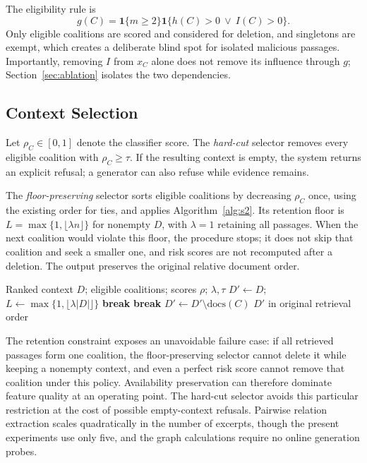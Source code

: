 \documentclass[sigconf]{aamas}
\begin{document}
The eligibility rule is
\begin{equation}
g(C)=\mathbf{1}\{m\geq2\}\mathbf{1}\{h(C)>0\ \lor\ I(C)>0\}.
\label{eq:gate}
\end{equation}
Only eligible coalitions are scored and considered for deletion, and singletons are exempt, which creates a deliberate blind spot for isolated malicious passages. Importantly, removing $I$ from $x_C$ alone does not remove its influence through $g$; Section~\ref{sec:ablation} isolates the two dependencies.

\subsection{Context Selection}
Let $\rho_C\in[0,1]$ denote the classifier score. The \emph{hard-cut} selector removes every eligible coalition with $\rho_C\geq\tau$. If the resulting context is empty, the system returns an explicit refusal; a generator can also refuse while evidence remains.

The \emph{floor-preserving} selector sorts eligible coalitions by decreasing $\rho_C$ once, using the existing order for ties, and applies Algorithm~\ref{alg:s2}. Its retention floor is $L=\max\{1,\lfloor\lambda n\rfloor\}$ for nonempty $D$, with $\lambda=1$ retaining all passages. When the next coalition would violate this floor, the procedure stops; it does not skip that coalition and seek a smaller one, and risk scores are not recomputed after a deletion. The output preserves the original relative document order.

\begin{algorithm}[t]
\caption{Floor-preserving selection with a retention floor}
\label{alg:s2}
\begin{algorithmic}[1]
\Require Ranked context $D$; eligible coalitions; scores $\rho$; $\lambda,\tau$
\State $D'\gets D$; $L\gets\max\{1,\lfloor\lambda|D|\rfloor\}$
    \State \textbf{break}
  \EndIf
    \State \textbf{break}
  \EndIf
  \State $D'\gets D'\setminus\mathrm{docs}(C)$
\EndFor
\State \Return $D'$ in original retrieval order
\end{algorithmic}
\end{algorithm}

The retention constraint exposes an unavoidable failure case: if all retrieved passages form one coalition, the floor-preserving selector cannot delete it while keeping a nonempty context, and even a perfect risk score cannot remove that coalition under this policy. Availability preservation can therefore dominate feature quality at an operating point. The hard-cut selector avoids this particular restriction at the cost of possible empty-context refusals. Pairwise relation extraction scales quadratically in the number of excerpts, though the present experiments use only five, and the graph calculations require no online generation probes.
\end{document}
